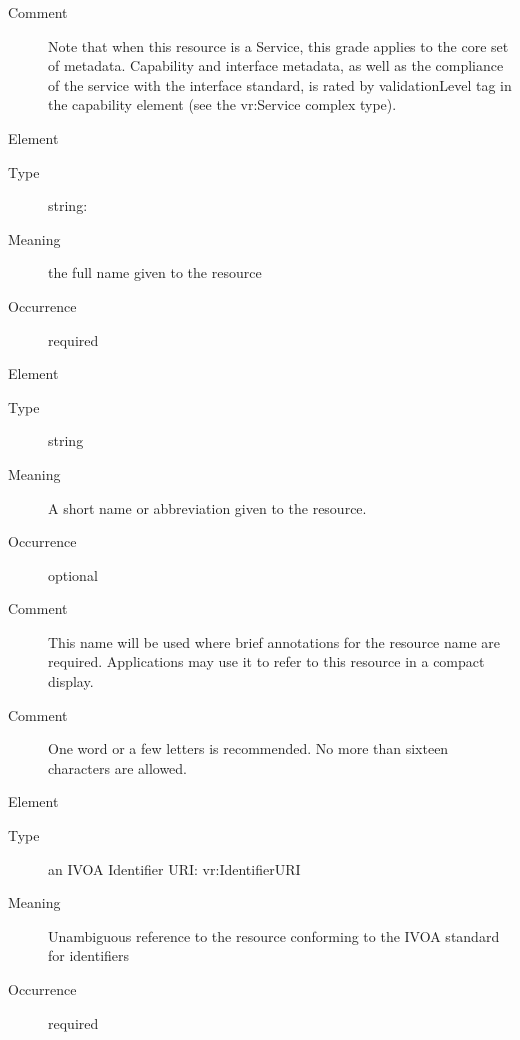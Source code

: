 \documentclass[11pt,a4paper]{ivoa}
\begin{document}
\begin{generated}
\begin{bigdescription}
\begin{description}
\item[Comment]
                  Note that when this resource is a Service, this
                  grade applies to the core set of metadata.
                  Capability and interface metadata, as well as the
                  compliance of the service with the interface
                  standard, is rated by validationLevel tag in the
                  capability element (see the vr:Service complex
                  type).


\end{description}
\item[Element \xmlel{title}]
\begin{description}
\item[Type] string: 
\item[Meaning]
                  the full name given to the resource

\item[Occurrence] required

\end{description}
\item[Element \xmlel{shortName}]
\begin{description}
\item[Type] string
\item[Meaning]
                 A short name or abbreviation given to the resource.

\item[Occurrence] optional

\item[Comment]
                 This name will be used where brief annotations for
                 the resource name are required.  Applications may
                 use it to refer to this resource in a compact display.

\item[Comment]
                 One word or a few letters is recommended.  No more
                 than sixteen characters are allowed.


\end{description}
\item[Element \xmlel{identifier}]
\begin{description}
\item[Type] an IVOA Identifier URI: vr:IdentifierURI
\item[Meaning]
                  Unambiguous reference to the resource conforming to the IVOA
                  standard for identifiers

\item[Occurrence] required



\end{description}
\end{bigdescription}
\end{generated}
\end{document}
